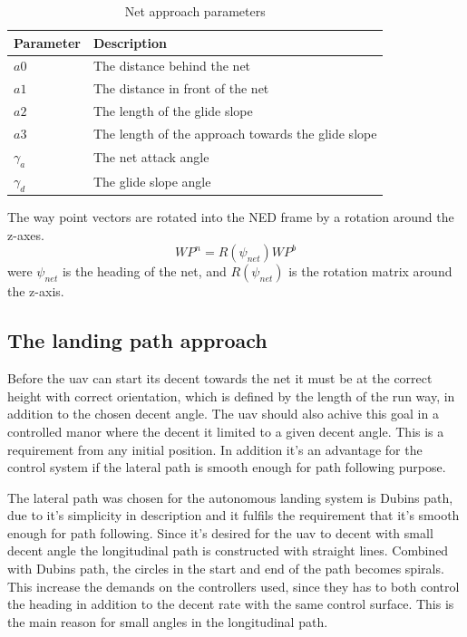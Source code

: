 \begin{table}[H]
\begin{center}
    \begin{tabular}{ | l | l |}
    \hline
    \textbf{Parameter} & \textbf{Description} \\ \hline
    $a0$ & The distance behind the net \\ \hline
    $a1$ & The distance in front of the net \\ \hline
    $a2$ & The length of the glide slope \\ \hline
    $a3$ & The length of the approach towards the glide slope \\ \hline
    $\gamma_a$ & The net attack angle \\ \hline
    $\gamma_d$ & The glide slope angle \\ \hline
    \end{tabular}
\end{center}
\caption{Net approach parameters }
\label{Tb:Approach Parameters}
\end{table}
The way point vectors are rotated into the NED frame by a rotation around the z-axes.
\begin{equation}
WP^n = R(\psi_{net})WP^b
\end{equation}
were $\psi_{net}$ is the heading of the net, and $R(\psi_{net})$ is the rotation matrix around the z-axis.
\begin{figure}\label{Fig:LandingPhase}
\def\svgwidth{\textwidth} %

\end{figure}

\subsection{The landing path approach}\label{SS:LandingApproach}
Before the \gls{uav} can start its decent towards the net it must be at the correct height with correct orientation, which is defined by the length of the run way, in addition to the chosen decent angle. The \gls{uav} should also achive this goal in a controlled manor where the decent it limited to a given decent angle. This is a requirement from any initial position. In addition it's an advantage for the control system if the lateral path is smooth enough for path following purpose.

The lateral path was chosen for the autonomous landing system is Dubins path, due to it's simplicity in description and it fulfils the requirement that it's smooth enough for path following. Since it's desired for the \gls{uav} to decent with small decent angle the longitudinal path is constructed with straight lines. Combined with Dubins path, the circles in the start and end of the path becomes spirals. This increase the demands on the controllers used, since they has to both control the heading in addition to the decent rate with the same control surface. This is the main reason for small angles in the longitudinal path.

